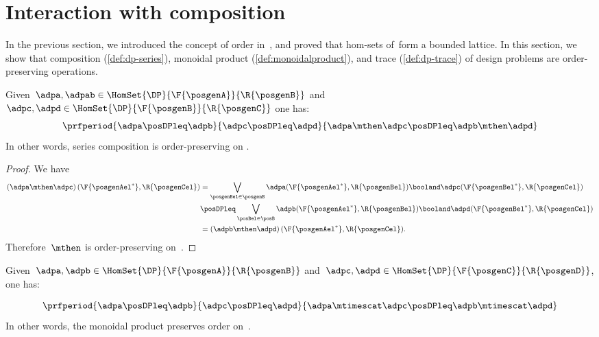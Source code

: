 
\section{Interaction with composition}
In the previous section, we introduced the concept of order in~\DP, and proved that hom-sets of~\DP form a bounded lattice.
In this section, we show that composition (\cref{def:dp-series}), monoidal product (\cref{def:monoidalproduct}), and trace (\cref{def:dp-trace}) of design problems are order-preserving operations.

\begin{lemma}
    \label{lem:series_pres_order}
    Given~$\adpa,\adpab \in \HomSet{\DP}{\F{\posgenA}}{\R{\posgenB}}$ and~$\adpc,\adpd \in \HomSet{\DP}{\F{\posgenB}}{\R{\posgenC}}$ one has:
    \begin{equation}
        \prfperiod{\adpa\posDPleq \adpb}{\adpc\posDPleq \adpd}{\adpa\mthen \adpc \posDPleq \adpb\mthen \adpd}
    \end{equation}
    In other words, series composition is order-preserving on \DP.
\end{lemma}

\begin{proof}
    We have
    \begin{equation}
        \label{eq:series_pres_ord}
        \begin{aligned}
            \left( \adpa\mthen \adpc\right)(\F{\posgenAel^*},\R{\posgenCel}) & =
            \bigvee_{\posgenBel\in \posgenB}\adpa(\F{\posgenAel^*},\R{\posgenBel})\booland \adpc(\F{\posgenBel^*},\R{\posgenCel})                                                                         \\
                                                                             & \posDPleq \bigvee_{\posBel\in \posB} \adpb(\F{\posgenAel^*},\R{\posgenBel})\booland \adpd(\F{\posgenBel^*},\R{\posgenCel}) \\
                                                                             & =\left( \adpb\mthen \adpd\right)(\F{\posgenAel^*},\R{\posgenCel}).
        \end{aligned}
    \end{equation}
    Therefore~$\mthen$ is order-preserving on~\DP.
\end{proof}

\begin{lemma}
    \label{lem:tens_pres_order}
    Given~$\adpa,\adpb \in \HomSet{\DP}{\F{\posgenA}}{\R{\posgenB}}$ and~$\adpc,\adpd \in \HomSet{\DP}{\F{\posgenC}}{\R{\posgenD}}$, one has:

    \begin{equation}
        \prfperiod{
            \adpa\posDPleq \adpb
        }{
            \adpc\posDPleq \adpd
        }{
            \adpa\mtimescat \adpc \posDPleq \adpb\mtimescat \adpd
        }
    \end{equation}
    In other words, the monoidal product preserves order on~\DP.
\end{lemma}

